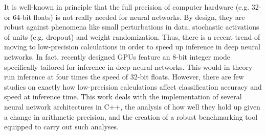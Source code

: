 It is well-known in principle that the full precision of computer hardware (e.g. 32- or 64-bit floats) is not really needed for neural networks. By design, they are robust against phenomena like small perturbations in data, stochastic activations of units (e.g. dropout) and weight randomization. Thus, there is a recent trend of moving to low-precision calculations in order to speed up inference in deep neural networks. In fact, recently designed GPUs feature an 8-bit integer mode specifically tailored for inference in deep neural networks. This would in theory run inference at four times the speed of 32-bit floats. However, there are few studies on exactly how low-precision calculations affect classification accuracy and speed at inference time. This work deals with the implementation of several neural network architectures in C++, the analysis of how well they hold up given a change in arithmetic precision, and the creation of a robust benchmarking tool equipped to carry out such analyses.
